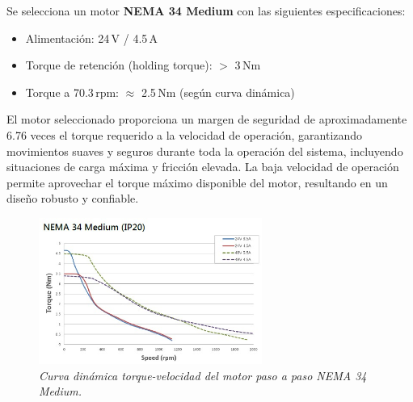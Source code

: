 Se selecciona un motor \textbf{NEMA 34 Medium} con las siguientes especificaciones:
\begin{itemize}[label=$\bullet$]
    \item Alimentación: 24\,V / 4.5\,A
    \item Torque de retención (holding torque): $>$ 3\,Nm
    \item Torque a 70.3\,rpm: $\approx$ 2.5\,Nm (según curva dinámica)
\end{itemize}

El motor seleccionado proporciona un margen de seguridad de aproximadamente 6.76 veces el torque requerido a la velocidad de operación, garantizando movimientos suaves y seguros durante toda la operación del sistema, incluyendo situaciones de carga máxima y fricción elevada. La baja velocidad de operación permite aprovechar el torque máximo disponible del motor, resultando en un diseño robusto y confiable.

\begin{figure}[H]
    \centering
    \includegraphics[width=0.65\textwidth]{img/Nema34.jpg}
    \caption{\textit{Curva dinámica torque-velocidad del motor paso a paso NEMA 34 Medium.}}
    \label{fig:Curva_din_nema34}
\end{figure}